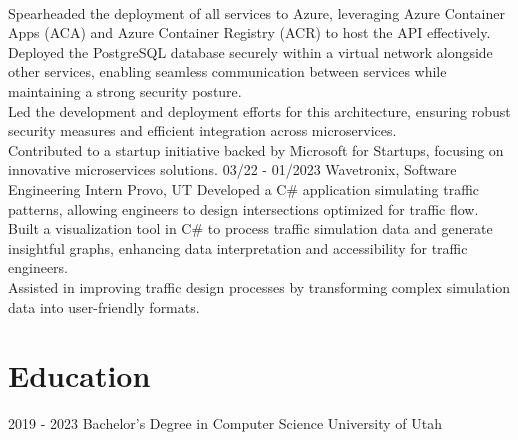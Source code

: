 \documentclass[]{friggeri-cv}
\begin{document}
\begin{entrylist}
{    \\Spearheaded the deployment of all services to Azure, leveraging Azure Container Apps (ACA) and Azure Container Registry (ACR) to host the API effectively.
    \\Deployed the PostgreSQL database securely within a virtual network alongside other services, enabling seamless communication between services while maintaining a strong security posture.
    \\Led the development and deployment efforts for this architecture, ensuring robust security measures and efficient integration across microservices.
    \\Contributed to a startup initiative backed by Microsoft for Startups, focusing on innovative microservices solutions.
    }
  \entry
    {03/22 - 01/2023}
    {Wavetronix, Software Engineering Intern}
    {Provo, UT}
    {Developed a C\# application simulating traffic patterns, allowing engineers to design intersections optimized for traffic flow.
    \\Built a visualization tool in C\# to process traffic simulation data and generate insightful graphs, enhancing data interpretation and accessibility for traffic engineers.
    \\Assisted in improving traffic design processes by transforming complex simulation data into user-friendly formats.
    }
\end{entrylist}

\section{Education}
\begin{entrylist}
  \entry
    {2019 - 2023}
    {Bachelor's Degree in Computer Science}
    {University of Utah}
    {}
\end{entrylist}
\end{document}
